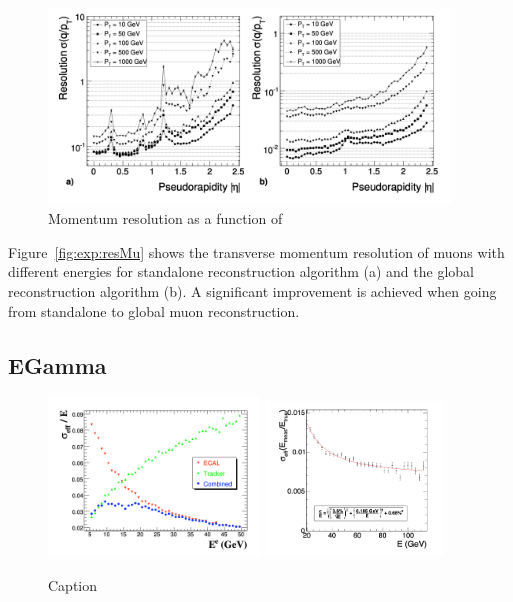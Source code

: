 \begin{figure}[ht]
    \centering
    \includegraphics[width=0.95\textwidth]{chapters/CMSExperiment/sectionReconstruction/figures/resMu.png}
    \caption{Momentum resolution as a function of }
    \label{fig:cmsexperiment:reconstruction:resMu}
\end{figure}


Figure~\ref{fig:exp:resMu} shows the transverse momentum resolution of muons with different energies for standalone reconstruction algorithm (a) and the global reconstruction algorithm (b). A significant improvement is achieved when going from standalone to global muon reconstruction.





\subsection{EGamma}

\begin{figure}[ht]
    \centering
    \includegraphics[width=0.5\textwidth]{chapters/CMSExperiment/sectionReconstruction/figures/resEle.png}
    \includegraphics[width=0.42\textwidth]{chapters/CMSExperiment/sectionReconstruction/figures/resGamma.png}
    \caption{Caption}
    \label{fig:cmsexperiment:reconstruction:resEle}
\end{figure}

